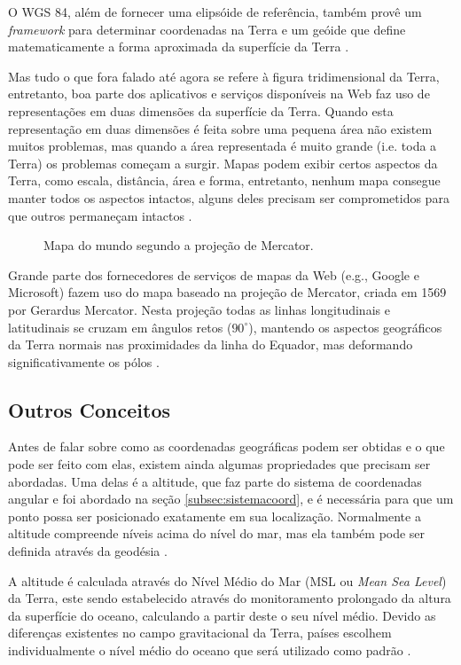 \documentclass[diss]{template/setrem}
\begin{document}
O WGS 84, além de fornecer uma elipsóide de referência, também provê um \emph{framework} para determinar coordenadas na Terra e um geóide que define matematicamente a forma aproximada da superfície da Terra \citep{Holdener2011}.

Mas tudo o que fora falado até agora se refere à figura tridimensional da Terra, entretanto, boa parte dos aplicativos e serviços disponíveis na Web faz uso de representações em duas dimensões da superfície da Terra. Quando esta representação em duas dimensões é feita sobre uma pequena área não existem muitos problemas, mas quando a área representada é muito grande (i.e. toda a Terra) os problemas começam a surgir. Mapas podem exibir certos aspectos da Terra, como escala, distância, área e forma, entretanto, nenhum mapa consegue manter todos os aspectos intactos, alguns deles precisam ser comprometidos para que outros permaneçam intactos \citep{Holdener2011}.

\begin{figure}[!h]
    \caption{Mapa do mundo segundo a projeção de Mercator.}
    \label{fig:projemercator}
\end{figure}

Grande parte dos fornecedores de serviços de mapas da Web (e.g., Google e Microsoft) fazem uso do mapa baseado na projeção de Mercator, criada em 1569 por Gerardus Mercator. Nesta projeção todas as linhas longitudinais e latitudinais se cruzam em ângulos retos ($90^{\circ}$), mantendo os aspectos geográficos da Terra normais nas proximidades da linha do Equador, mas deformando significativamente os pólos \citep{Holdener2011}.

\subsection{Outros Conceitos}
Antes de falar sobre como as coordenadas geográficas podem ser obtidas e o que pode ser feito com elas, existem ainda algumas propriedades que precisam ser abordadas. Uma delas é a altitude, que faz parte do sistema de coordenadas angular e foi abordado na seção \ref{subsec:sistemacoord}, e é necessária para que um ponto possa ser posicionado exatamente em sua localização. Normalmente a altitude compreende níveis acima do nível do mar, mas ela também pode ser definida através da geodésia \citep{Holdener2011}.

A altitude é calculada através do Nível Médio do Mar (MSL ou \emph{Mean Sea Level}) da Terra, este sendo estabelecido através do monitoramento prolongado da altura da superfície do oceano, calculando a partir deste o seu nível médio. Devido as diferenças existentes no campo gravitacional da Terra, países escolhem individualmente o nível médio do oceano que será utilizado como padrão \citep{Holdener2011}.
\end{document}
